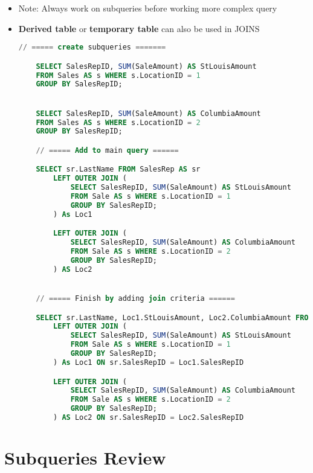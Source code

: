 \documentclass[12pt]{article}
\begin{document}
\begin{itemize}
    \item Note: Always work on subqueries before working more complex query
    \item \textbf{Derived table} or \textbf{temporary table} can also be used in JOINS

    \begin{lstlisting}[language=SQL]
    // ===== create subqueries =======

    SELECT SalesRepID, SUM(SaleAmount) AS StLouisAmount
    FROM Sales AS s WHERE s.LocationID = 1
    GROUP BY SalesRepID;


    SELECT SalesRepID, SUM(SaleAmount) AS ColumbiaAmount
    FROM Sales AS s WHERE s.LocationID = 2
    GROUP BY SalesRepID;

    // ===== Add to main query ======

    SELECT sr.LastName FROM SalesRep AS sr
        LEFT OUTER JOIN (
            SELECT SalesRepID, SUM(SaleAmount) AS StLouisAmount
            FROM Sale AS s WHERE s.LocationID = 1
            GROUP BY SalesRepID;
        ) As Loc1

        LEFT OUTER JOIN (
            SELECT SalesRepID, SUM(SaleAmount) AS ColumbiaAmount
            FROM Sale AS s WHERE s.LocationID = 2
            GROUP BY SalesRepID;
        ) AS Loc2


    // ===== Finish by adding join criteria ======

    SELECT sr.LastName, Loc1.StLouisAmount, Loc2.ColumbiaAmount FROM SalesRep AS sr
        LEFT OUTER JOIN (
            SELECT SalesRepID, SUM(SaleAmount) AS StLouisAmount
            FROM Sale AS s WHERE s.LocationID = 1
            GROUP BY SalesRepID;
        ) As Loc1 ON sr.SalesRepID = Loc1.SalesRepID

        LEFT OUTER JOIN (
            SELECT SalesRepID, SUM(SaleAmount) AS ColumbiaAmount
            FROM Sale AS s WHERE s.LocationID = 2
            GROUP BY SalesRepID;
        ) AS Loc2 ON sr.SalesRepID = Loc2.SalesRepID


    \end{lstlisting}
\end{itemize}

\bigskip

\section{Subqueries Review}

\bigskip
\end{document}
